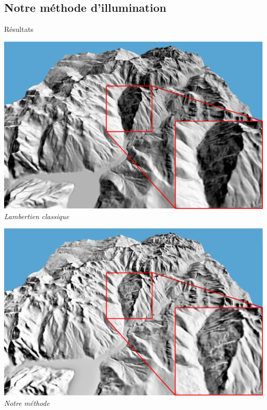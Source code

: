 \documentclass{beamer}
\begin{document}
\subsection*{Notre méthode d'illumination}
\begin{frame}{Résultats}
\begin{center}
	\begin{minipage}[t]{0.32\linewidth}
    \begin{center}
    	\includegraphics[width=1.0\linewidth]{Resultats/lambertien.png}\\
 		\textit{Lambertien classique}
    \end{center}
    \end{minipage}
    \begin{minipage}[t]{0.32\linewidth}
    \begin{center}
    	\includegraphics[width=1.0\linewidth]{Resultats/ombrage.png}\\
 		\textit{Notre méthode}

\end{center}
\end{minipage}
\end{center}
\end{frame}
\end{document}
